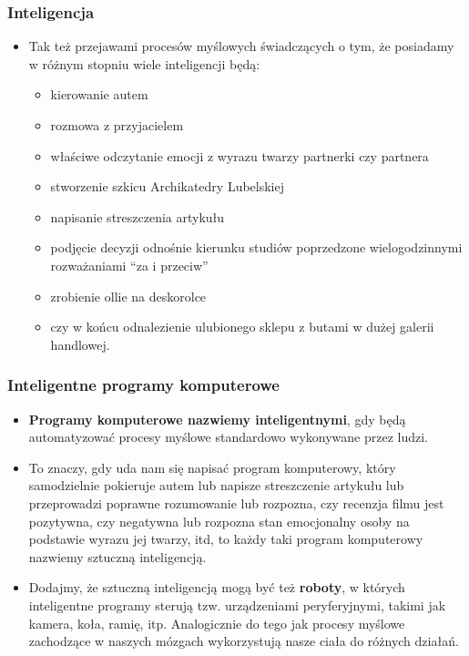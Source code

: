 \documentclass{beamer}
\begin{document}
\begin{frame}[fragile]
\frametitle{Inteligencja}
\begin{itemize}
\item Tak też przejawami procesów myślowych świadczących o tym, że posiadamy w różnym stopniu wiele inteligencji będą:
	\begin{itemize}
	\item kierowanie autem
	\item rozmowa z przyjacielem
	\item właściwe odczytanie emocji z wyrazu twarzy partnerki czy partnera
	\item stworzenie szkicu Archikatedry Lubelskiej
	\item napisanie streszczenia artykułu
	\item podjęcie decyzji odnośnie kierunku studiów poprzedzone wielogodzinnymi rozważaniami “za i przeciw”
	\item zrobienie ollie na deskorolce
	\item czy w końcu odnalezienie ulubionego sklepu z butami w dużej galerii handlowej.
	\end{itemize}
\end{itemize}
\end{frame}

\begin{frame}[fragile]
\frametitle{Inteligentne programy komputerowe}
\begin{itemize}
\item \textbf{Programy komputerowe nazwiemy inteligentnymi}, gdy będą automatyzować procesy myślowe standardowo wykonywane przez ludzi.
\item To znaczy, gdy uda nam się napisać program komputerowy, który samodzielnie pokieruje autem lub napisze streszczenie artykułu lub przeprowadzi poprawne rozumowanie lub rozpozna, czy recenzja filmu jest pozytywna, czy negatywna lub rozpozna stan emocjonalny osoby na podstawie wyrazu jej twarzy, itd, to każdy taki program komputerowy nazwiemy sztuczną inteligencją. 
\item Dodajmy, że sztuczną inteligencją mogą być też \textbf{roboty}, w których inteligentne programy sterują tzw. urządzeniami peryferyjnymi, takimi jak kamera, koła, ramię, itp. Analogicznie do tego jak procesy myślowe zachodzące w naszych mózgach wykorzystują nasze ciała do różnych działań. 
\end{itemize}

\end{frame}
\end{document}
